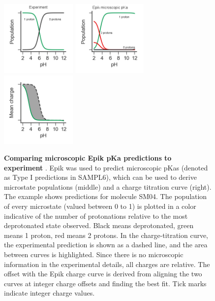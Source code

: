 \documentclass[9pt,lineno,final]{elife}
\begin{document}
\begin{figure}[H]
	\centering
	\includegraphics[width=0.33\textwidth]{Reports/Experiment-populations-SM04-titled.png}
	\includegraphics[width=0.33\textwidth]{Reports/Epik-TypeI-populations-SM04-titled.png}
	\includegraphics[width=0.33\textwidth]{Reports/Epik-TypeI-virtual-titration-SM04.png}
		\caption{{\bf Comparing microscopic Epik pKa predictions to experiment} . Epik was used to predict microscopic pKas (denoted as Type I predictions in SAMPL6), which can be used to derive microstate populations (middle) and a charge titration curve (right). The example shows predictions for molecule SM04. The population of every microstate (valued between 0 to 1) is plotted in a color indicative of the number of protonations relative to the most deprotonated state observed. Black means deprotonated, green means 1 proton, red means 2 protons. In the charge-titration curve, the experimental prediction is shown as a dashed line, and the area between curves is highlighted. Since there is no microscopic information in the experimental details, all charges are relative. The offset with the Epik charge curve is derived from aligning the two curves at integer charge offsets and finding the best fit. Tick marks indicate integer charge values.  
	\label{fig:epiki-prediction}}
\end{figure}
\end{document}
